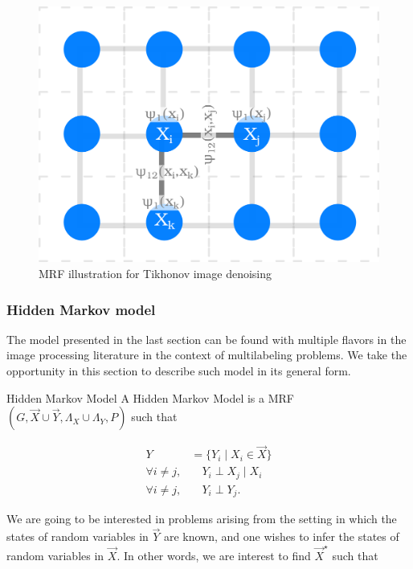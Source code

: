 \begin{figure}
\center
\includegraphics[scale=0.10]{figures/chapter3/grid-graph.png}
\caption{MRF illustration for Tikhonov image denoising}
\label{ch2:fig:mrf-tikhonov-denoising}
\end{figure}

\subsubsection{Hidden Markov model}

The model presented in the last section can be found with multiple flavors in the image processing literature in the context of multilabeling problems. We take the opportunity in this section to describe such model in its general form.

\begin{definition}{Hidden Markov Model}
A Hidden Markov Model is a MRF $(G,\vec{X} \cup \vec{Y}, \Lambda_X \cup \Lambda_Y,P)$ such that

\begin{align*}
	Y &= \{ Y_i \; | \; X_i \in \vec{X} \} \\
	\forall i \neq j,& \quad Y_i \perp X_j \; | \; X_i \\
	\forall i \neq j,& \quad Y_i \perp Y_j	.
\end{align*}
\end{definition}

We are going to be interested in problems arising from the setting in which the states of random variables in $\vec{Y}$ are known, and one wishes to infer the states of random variables in $\vec{X}$. In other words, we are interest to find $\vec{X}^{\star}$ such that

